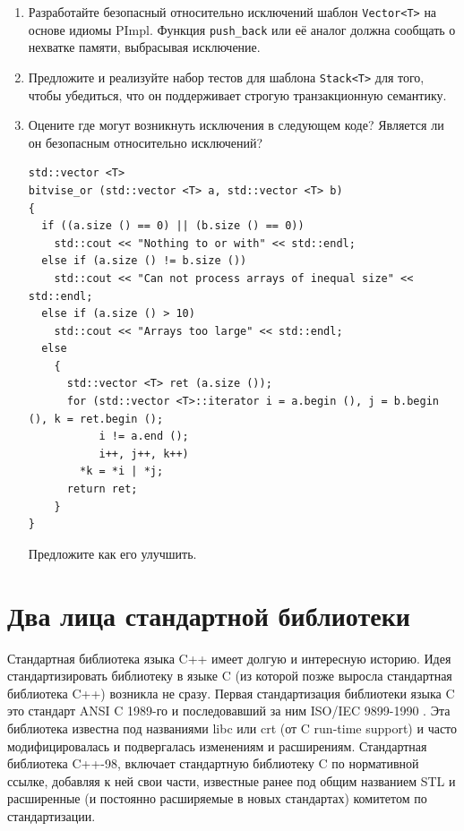 \documentclass[a4paper,12pt,oneside]{article}
\begin{document}
\begin{enumerate}

\item Разработайте безопасный относительно исключений шаблон \lstinline!Vector<T>! на основе идиомы PImpl. Функция \lstinline!push_back! или её аналог должна сообщать о нехватке памяти, выбрасывая исключение.

\item Предложите и реализуйте набор тестов для шаблона \lstinline!Stack<T>! для того, чтобы убедиться, что он поддерживает строгую транзакционную семантику.

\item Оцените где могут возникнуть исключения в следующем коде? Является ли он безопасным относительно исключений?

\begin{lstlisting}
std::vector <T>
bitvise_or (std::vector <T> a, std::vector <T> b)
{
  if ((a.size () == 0) || (b.size () == 0))
    std::cout << "Nothing to or with" << std::endl;
  else if (a.size () != b.size ())
    std::cout << "Can not process arrays of inequal size" << std::endl;
  else if (a.size () > 10)
    std::cout << "Arrays too large" << std::endl;
  else
    {
      std::vector <T> ret (a.size ());
      for (std::vector <T>::iterator i = a.begin (), j = b.begin (), k = ret.begin (); 
           i != a.end (); 
           i++, j++, k++)
        *k = *i | *j;
      return ret;
    }
}
\end{lstlisting}

Предложите как его улучшить.

\end{enumerate}

\pagebreak
\section{Два лица стандартной библиотеки}

Стандартная библиотека языка C++ имеет долгую и интересную историю. Идея стандартизировать библиотеку в языке C (из которой позже выросла стандартная библиотека C++) возникла не сразу. Первая стандартизация библиотеки языка C это стандарт ANSI C 1989-го и последовавший за ним ISO/IEC 9899-1990 \cite{stdc90}. Эта библиотека известна под названиями libc или crt (от C run-time support) и часто модифицировалась и подвергалась изменениям и расширениям. Стандартная библиотека C++-98, включает стандартную библиотеку C по нормативной ссылке, добавляя к ней свои части, известные ранее под общим названием STL и расширенные (и постоянно расширяемые в новых стандартах) комитетом по стандартизации.
\end{document}
